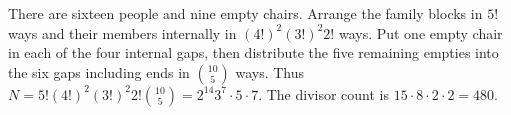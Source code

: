 There are sixteen people and nine empty chairs. Arrange the family blocks in $5!$ ways and their members internally in $(4!)^2(3!)^2 2!$ ways. Put one empty chair in each of the four internal gaps, then distribute the five remaining empties into the six gaps including ends in $\binom{10}{5}$ ways. Thus $N=5!(4!)^2(3!)^2 2!\binom{10}{5}=2^{14}3^7\cdot5\cdot7$. The divisor count is $\boxed{15\cdot8\cdot2\cdot2=480}$.
